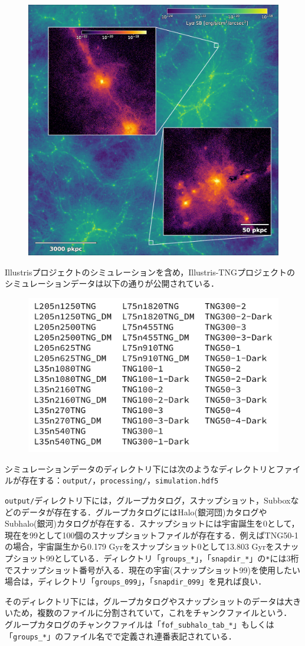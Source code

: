 \begin{figure}
	\centering
	\includegraphics[width=0.7\linewidth]{./pic/TNG50_z3_LymanAlpha_emission_2k.png}
	\caption{}
	\label{fig:TNG50_z3_LymanAlpha_emission_2k}
\end{figure}

Illustrisプロジェクトのシミュレーションを含め，Illustris-TNGプロジェクトのシミュレーションデータは以下の通りが公開されている．

\begin{figure}[H]
	\centering
	\includegraphics[width=0.5\linewidth]{./pic/ALLsimTNG.pdf}
\end{figure}

シミュレーションデータのディレクトリ下には次のようなディレクトリとファイルが存在する：\texttt{output/}，\texttt{processing/}，\texttt{simulation.hdf5}

\texttt{output/}ディレクトリ下には，グループカタログ，スナップショット，Subboxなどのデータが存在する．グループカタログにはHalo(銀河団)カタログやSubhalo(銀河)カタログが存在する．スナップショットには宇宙誕生を0として，現在を99として100個のスナップショットファイルが存在する．例えばTNG50-1の場合，宇宙誕生から0.179 Gyrをスナップショット0として13.803 Gyrをスナップショット99としている．ディレクトリ「\texttt{groups\_*}」，「\texttt{snapdir\_*}」の\texttt{*}には3桁でスナップショット番号が入る．現在の宇宙(スナップショット99)を使用したい場合は，ディレクトリ「\texttt{groups\_099}」，「\texttt{snapdir\_099}」を見れば良い．

そのディレクトリ下には，グループカタログやスナップショットのデータは大きいため，複数のファイルに分割されていて，これをチャンクファイルという． グループカタログのチャンクファイルは「\texttt{fof\_subhalo\_tab\_*}」もしくは「\texttt{groups\_*}」のファイル名でで定義され連番表記されている．
